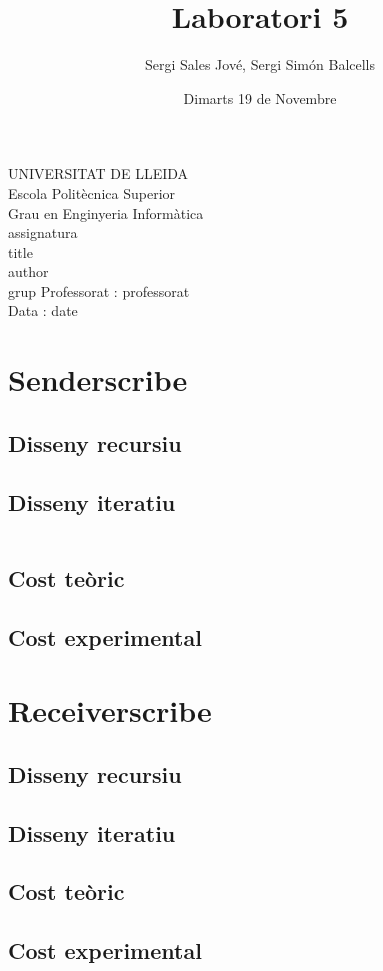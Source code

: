 \documentclass{article}
\title{Laboratori 5}
\author{Sergi Sales Jové, Sergi Simón Balcells}
\date{Dimarts 19 de Novembre}
\renewcommand{\maketitle}{ %
    \begin{titlepage}
        \raggedright{UNIVERSITAT DE LLEIDA \\
            Escola Politècnica Superior \\
            Grau en Enginyeria Informàtica\\
            \1assignatura\\}
            \vspace{5cm}
            \centering\huge{\5title \\}
            \vspace{3cm}
            \large{\6author} \\
            \normalsize{\3grup}
            \vfill
            Professorat : \4professorat \\
            Data : \7date
\end{titlepage}}
\begin{document}
\maketitle
\thispagestyle{empty}

\newpage
{}
\tableofcontents
\newpage
{}

\section{Senderscribe}
\subsection{Disseny recursiu}
\newpage
\subsection{Disseny iteratiu}
\begin{lstlisting}

\end{lstlisting}


\subsection{Cost teòric}
\subsection{Cost experimental}

\section{Receiverscribe}
\subsection{Disseny recursiu}
\subsection{Disseny iteratiu}
\subsection{Cost teòric}
\subsection{Cost experimental}
\end{document}
